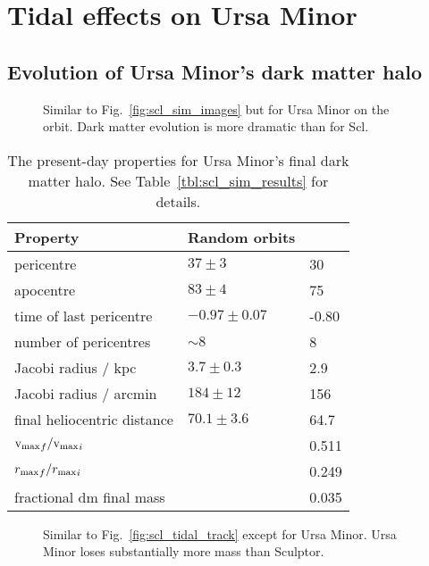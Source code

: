 \section{Tidal effects on Ursa Minor}\label{tidal-effects-on-ursa-minor}

\subsection{Evolution of Ursa Minor's dark matter
halo}\label{evolution-of-ursa-minors-dark-matter-halo}

\begin{figure}
\centering
{}
\caption[Ursa Minor simulation snapshots]{Similar to
Fig.~\ref{fig:scl_sim_images} but for Ursa Minor on the \smallperi{}
orbit. Dark matter evolution is more dramatic than for
Scl.}\label{fig:umi_sim_images}
\end{figure}

\begin{table*}[t]
\centering
\caption[Simulation results for Ursa Minor’s dark matter]{The present-day properties for Ursa Minor’s final dark matter halo. See Table \ref{tbl:scl_sim_results} for details. }
\label{tbl:umi_sim_results}
\begin{tabular}{lll}
\toprule
Property & Random orbits & \smallperi{}\\
\midrule
pericentre & $37\pm3$ & 30\\
apocentre & $83 \pm 4$ & 75\\
time of last pericentre & $-0.97 \pm 0.07$ & -0.80\\
number of pericentres & $\sim 8$ & 8\\
Jacobi radius / kpc & $3.7 \pm 0.3$ & 2.9\\
Jacobi radius / arcmin & $184 \pm 12$ & 156\\
final heliocentric distance & $70.1 \pm 3.6$ & 64.7\\
${{\rm v}_{\rm max}}_f / {{\rm v}_{\rm max}}_i$ &  & 0.511\\
${r_{\rm max}}_f / {r_{\rm max}}_i$ &  & 0.249\\
fractional dm final mass &  & 0.035\\
\bottomrule
\end{tabular}
\end{table*}

\begin{figure}
\centering
{}
\caption[Ursa Minor tidal tracks]{Similar to
Fig.~\ref{fig:scl_tidal_track} except for Ursa Minor. Ursa Minor loses
substantially more mass than Sculptor.}\label{fig:umi_tidal_track}
\end{figure}

